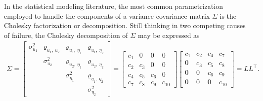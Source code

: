 In the statistical modeling literature, the most common parametrization
employed to handle the components of a variance-covariance matrix
\(\Sigma\) is the Cholesky factorization or decomposition. Still
thinking in two competing causes of failure, the Cholesky decomposition
of \(\Sigma\) may be expressed as
\begin{align*}
  \Sigma =
  \begin{bmatrix}
    \sigma_{u_{1}}^{2}&
    \varrho_{u_{1},~u_{2}}&
    \varrho_{u_{1},~\eta_{1}}&\varrho_{u_{1},~\eta_{2}}\\
    &\sigma_{u_{2}}^{2}&
    \varrho_{u_{2},~\eta_{1}}&\varrho_{u_{2},~\eta_{2}}\\
    &&\sigma_{\eta_{1}}^{2}&\varrho_{\eta_{1},~\eta_{2}}\\
    &&&\sigma_{\eta_{2}}^{2}
  \end{bmatrix} =
        \begin{bmatrix}
          c_{1}&0&0&0\\
          c_{2}&c_{3}&0&0\\
          c_{4}&c_{5}&c_{6}&0\\
          c_{7}&c_{8}&c_{9}&c_{10}
        \end{bmatrix}\begin{bmatrix}
          c_{1}&c_{2}&c_{4}&c_{7}\\
          0&c_{3}&c_{5}&c_{8}\\
          0&0&c_{6}&c_{9}\\
          0&0&0&c_{10}
        \end{bmatrix} = LL^{\top}.
\end{align*}

